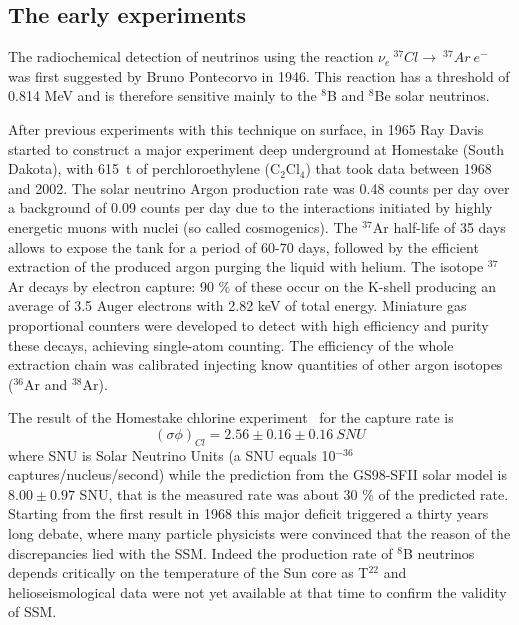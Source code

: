 \subsection{The early experiments}

The radiochemical detection of neutrinos using the reaction 
$\nu_e~^{37}Cl\rightarrow~^{37}Ar~e^-$ was first suggested by Bruno Pontecorvo in 1946\cite{pontecorvo46}. This reaction has a threshold of 0.814 MeV and is therefore sensitive mainly to the $^8$B and $^8$Be solar neutrinos.

After previous experiments with this technique on surface, in 1965 Ray  Davis started  to construct a major experiment deep underground at Homestake (South Dakota), with 615~t of perchloroethylene (C$_2$Cl$_4$) that took data between 1968 and 2002.
The solar neutrino Argon production rate was 0.48 counts per day over a background of 0.09 counts per day due to the interactions initiated by highly energetic muons with nuclei (so called cosmogenics).
The $^{37}$Ar half-life of 35 days allows to expose the tank for a period of 60-70 days, followed by the efficient extraction of the produced argon purging the liquid with helium.  
The isotope $^{37}$Ar decays by electron capture: 90 \% of these occur on the K-shell producing an average of 3.5 Auger electrons with 2.82 keV of total energy. Miniature gas proportional counters were developed to detect with high efficiency and purity these decays, achieving single-atom counting.
The efficiency of the whole extraction chain was calibrated injecting know quantities of other argon isotopes ($^{36}$Ar and $^{38}$Ar).  

The result of the Homestake chlorine experiment~\cite{cleveland} for the capture rate  is
\begin{equation}
(\sigma \phi)_{Cl} = 2.56 \pm 0.16 \pm 0.16 \: SNU
\end{equation}
where SNU is Solar Neutrino Units (a SNU equals 10$^{-36}$ captures/nucleus/second) while the prediction from the GS98-SFII solar model is $8.00 \pm 0.97$ SNU, that is the measured rate was about 30 \% of the predicted rate.  
Starting from the first result in 1968 this major deficit triggered a thirty years long debate, where many particle physicists were convinced that the reason of the discrepancies lied with the SSM. Indeed the production rate of $ {^8}$B neutrinos depends critically on the temperature of the Sun core as T$^{22}$ and helioseismological data were not yet available at that time to confirm the validity of SSM. 

